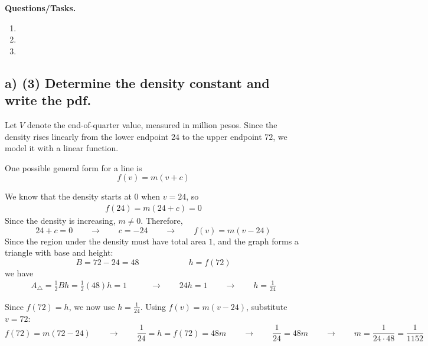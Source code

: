 \textbf{Questions/Tasks.}
\begin{enumerate}[label=\textbf{\alph*)}]
	\item {}
	\item {}
	\item {}
\end{enumerate}

\subsection*{a) \textbf{(3)} Determine the density constant and write the pdf.}
\label{subsec:online-coffee-sales-investment-c1-a}
Let $V$ denote the end-of-quarter value, measured in million pesos. Since the density rises linearly from the lower endpoint $24$ to the upper endpoint $72$, we model it with a linear function.

One possible general form for a line is
\[
f(v)=m(v+c)
\]

We know that the density starts at $0$ when $v=24$, so
\[
\begin{aligned}
	f(24)=m(24+c)=0
\end{aligned}
\]
%
Since the density is increasing, \(m\neq 0\). Therefore,
\[
24+c=0
\qquad \longrightarrow \qquad
c=-24
\qquad \longrightarrow \qquad
f(v)=m(v-24)
\]
%
Since the region under the density must have total area \(1\), and the graph forms a triangle with base and height:
\[
B = 72-24=48
\qquad \qquad  \qquad
h = f(72)
\]
we have
\[
\begin{aligned}
	A_{\triangle}=\frac{1}{2}Bh
	=\frac{1}{2}(48)h
	=1
	&\qquad \longrightarrow \qquad
	24h=1
	\qquad \longrightarrow \qquad
	h=\frac{1}{24}
\end{aligned}
\]

Since \(f(72)=h\), we now use \(h=\frac{1}{24}\). Using \(f(v)=m(v-24)\), substitute \(v=72\):
\[
f(72)=m(72-24)
\qquad \longrightarrow \qquad
\frac{1}{24}=h=f(72)=48m
\qquad \longrightarrow \qquad
\frac{1}{24}=48m
\qquad \longrightarrow \qquad
m=\frac{1}{24 \cdot 48}=\frac{1}{1152}
\]

